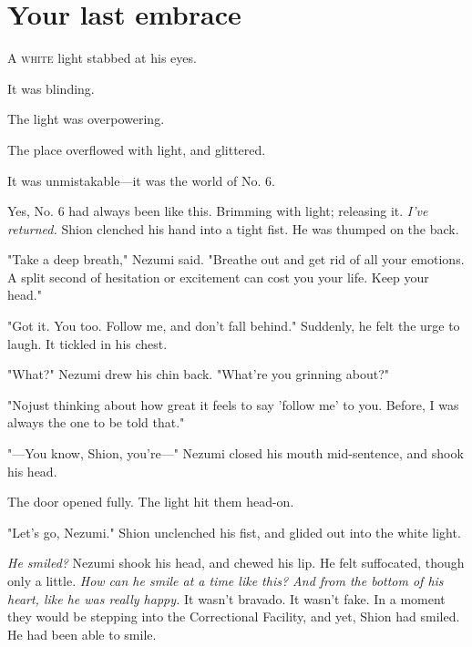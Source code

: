 
\chapter{Your last embrace}


\lettrine{A}{ white} light stabbed at his eyes.

It was blinding.

The light was overpowering.

The place overflowed with light, and glittered.

It was unmistakable---it was the world of No. 6.

\myspace

Yes, No. 6 had always been like this. Brimming with light; releasing it.
\emph{I've returned.} Shion clenched his hand into a tight fist. He was thumped
on the back.

"Take a deep breath," Nezumi said. "Breathe out and get rid of all your
emotions. A split second of hesitation or excitement can cost you your
life. Keep your head."

"Got it. You too. Follow me, and don't fall behind." Suddenly, he felt
the urge to laugh. It tickled in his chest.

"What?" Nezumi drew his chin back. "What're you grinning about?"

"No\el just thinking about how great it feels to say 'follow me' to you.
Before, I was always the one to be told that."

"---You know, Shion, you're---" Nezumi closed his mouth mid-sentence, and
shook his head.

The door opened fully. The light hit them head-on.

"Let's go, Nezumi." Shion unclenched his fist, and glided out into the
white light.

\myspace

\emph{He smiled?} Nezumi shook his head, and chewed his lip. He felt
suffocated, though only a little. \emph{How can he smile at a time like this?
And from the bottom of his heart, like he was really happy.} It wasn't
bravado. It wasn't fake. In a moment they would be stepping into the
Correctional Facility, and yet, Shion had smiled. He had been able to
smile.

